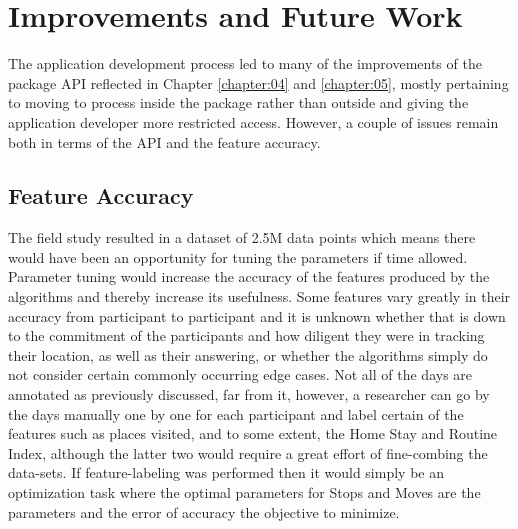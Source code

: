 \section{Improvements and Future Work}
The application development process led to many of the improvements of the package API reflected in Chapter \ref{chapter:04} and \ref{chapter:05}, mostly pertaining to moving to process inside the package rather than outside and giving the application developer more restricted access. However, a couple of issues remain both in terms of the API and the feature accuracy.

\subsection{Feature Accuracy}
The field study resulted in a dataset of 2.5M data points which means there would have been an opportunity for tuning the parameters if time allowed. Parameter tuning would increase the accuracy of the features produced by the algorithms and thereby increase its usefulness. Some features vary greatly in their accuracy from participant to participant and it is unknown whether that is down to the commitment of the participants and how diligent they were in tracking their location, as well as their answering, or whether the algorithms simply do not consider certain commonly occurring edge cases. Not all of the days are annotated as previously discussed, far from it, however, a researcher can go by the days manually one by one for each participant and label certain of the features such as places visited, and to some extent, the Home Stay and Routine Index, although the latter two would require a great effort of fine-combing the data-sets. If feature-labeling was performed then it would simply be an optimization task where the optimal parameters for Stops and Moves are the parameters and the error of accuracy the objective to minimize. 

